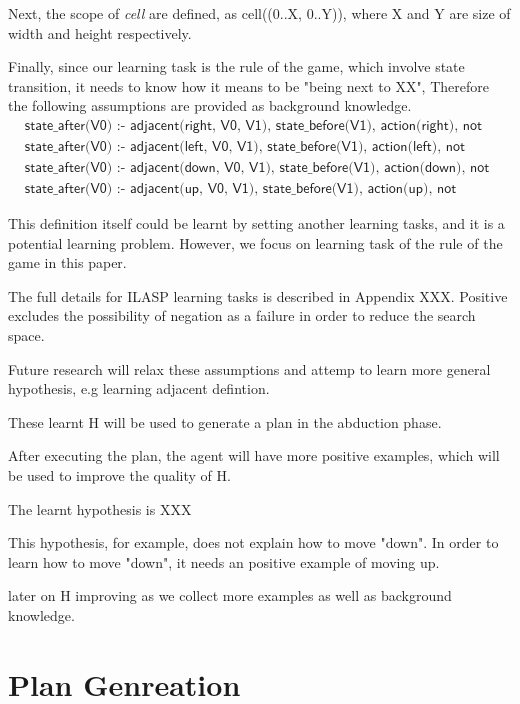 Next, the scope of \textit{cell} are defined, as cell((0..X, 0..Y)), where X and Y are size of width and height respectively.

Finally, since our learning task is the rule of the game, which involve state transition, it needs to know how it means to be "being next to XX",
Therefore the following assumptions are provided as background knowledge. 
\begin{equation}
\begin{split}
&\textsf{state\_after(V0) :- adjacent(right, V0, V1), state\_before(V1), action(right), not wall(V0).}\\
&\textsf{state\_after(V0) :- adjacent(left, V0, V1), state\_before(V1), action(left), not wall(V0).}\\
&\textsf{state\_after(V0) :- adjacent(down, V0, V1), state\_before(V1), action(down), not wall(V0).}\\
&\textsf{state\_after(V0) :- adjacent(up, V0, V1), state\_before(V1), action(up), not wall(V0).}
\end{split}
\end{equation}

This definition itself could be learnt by setting another learning tasks, and it is a potential learning problem. 
However, we focus on learning task of the rule of the game in this paper. 

The full details for ILASP learning tasks is described in Appendix XXX.
Positive excludes the possibility of negation as a failure in order to reduce the search space.

Future research will relax these assumptions and attemp to learn more general hypothesis, 
e.g learning adjacent defintion. 

These learnt H will be used to generate a plan in the abduction phase. 

After executing the plan, the agent will have more positive examples, which will be used to improve the quality of H. 

The learnt hypothesis is XXX

This hypothesis, for example, does not explain how to move "down". In order to learn how to move "down", it needs an positive example of moving up. 

later on H improving as we collect more examples as well as background knowledge.

\section{Plan Genreation}
\label{Plan_genreation}

